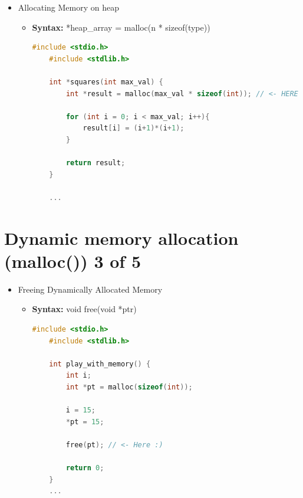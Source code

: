 \documentclass[12pt]{article}
\begin{document}
\bigskip

\begin{itemize}
    \item Allocating Memory on heap
    \begin{itemize}
        \item \textbf{Syntax:} *heap\_array = malloc(n * sizeof(type))

    \begin{lstlisting}[language=c,caption={dynamic\_mem\_example\_2.c}]
    #include <stdio.h>
    #include <stdlib.h>

    int *squares(int max_val) {
        int *result = malloc(max_val * sizeof(int)); // <- HERE :)

        for (int i = 0; i < max_val; i++){
            result[i] = (i+1)*(i+1);
        }

        return result;
    }

    ...
    \end{lstlisting}
    \end{itemize}
\end{itemize}

\bigskip

\section*{Dynamic memory allocation (malloc()) 3 of 5}

\bigskip


\begin{itemize}
    \item Freeing Dynamically Allocated Memory
    \begin{itemize}
        \item \textbf{Syntax:} void free(void *ptr)

    \begin{lstlisting}[language=c,caption={dynamic\_mem\_example\_2.c}]
    #include <stdio.h>
    #include <stdlib.h>

    int play_with_memory() {
        int i;
        int *pt = malloc(sizeof(int));

        i = 15;
        *pt = 15;

        free(pt); // <- Here :)

        return 0;
    }
    ...
    \end{lstlisting}
    \end{itemize}
\end{itemize}
\end{document}
